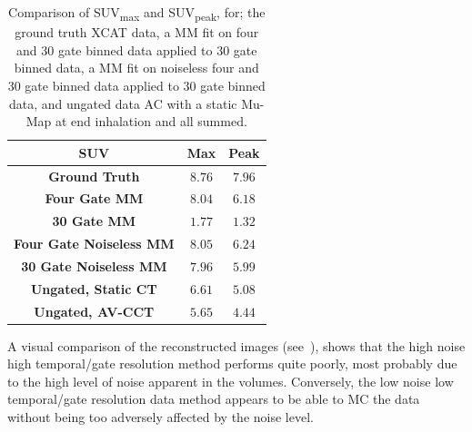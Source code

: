     \begin{table}
        
        \centering
        
        \captionsetup{singlelinecheck=false, justification=centering}
        \caption{
        \tiny
        Comparison of \acrshort{SUV}\textsubscript{max} and \acrshort{SUV}\textsubscript{peak}, for; the ground truth \acrshort{XCAT} data, a \gls{MM} fit on four and $30$ gate binned data applied to $30$ gate binned data, a \gls{MM} fit on noiseless four and $30$ gate binned data applied to $30$ gate binned data, and ungated data \gls{AC} with a static \gls{Mu-Map} at end inhalation and all  summed.}
        
        
        \resizebox*{0.6\linewidth}{!}
        {
            \begin{tabular}{||c|cc||}
                \hline
                \textbf{\acrshort{SUV}}                 & \textbf{Max}  & \textbf{Peak} \\
                \hline
                \textbf{Ground Truth}                   & $8.76$        & $7.96$ \\
                \hline
                \textbf{Four Gate \gls{MM}}             & $8.04$        & $6.18$ \\
                \textbf{30 Gate \gls{MM}}               & $1.77$        & $1.32$ \\
                \hline
                \textbf{Four Gate Noiseless \gls{MM}}   & $8.05$        & $6.24$ \\
                \textbf{30 Gate Noiseless \gls{MM}}     & $7.96$        & $5.99$ \\
                \hline
                \textbf{Ungated, Static \acrshort{CT}}  & $6.61$        & $5.08$ \\
                \textbf{Ungated, \gls{AV-CCT}}          & $5.65$        & $4.44$ \\
                \hline
            \end{tabular}
        }
        \label{tab:suv}
        
        \vspace{-0.5cm}
    \end{table}
    
    A visual comparison of the reconstructed images (see~), shows that the high noise high temporal/gate resolution method performs quite poorly, most probably due to the high level of noise apparent in the volumes. Conversely, the low noise low temporal/gate resolution data method appears to be able to \gls{MC} the data without being too adversely affected by the noise level.
     
